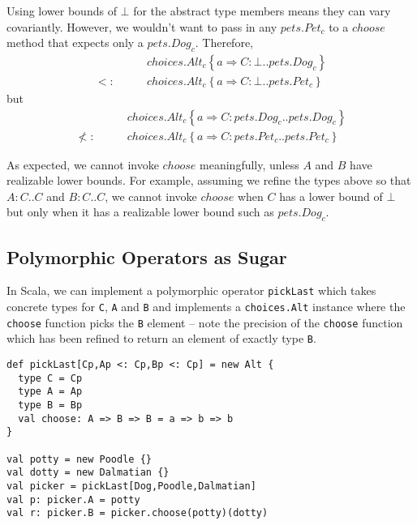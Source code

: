 \documentclass[9pt]{sigplanconf}
\def\code{\lstinline}  % shorter version so you can write \code|String[Foo]|
\newcommand{\mi}[1]{\mathit{#1}}
\newcommand{\gap}{\quad\quad}
\newcommand{\sub}{<:}
\newcommand{\refine}[2]{\left\{#1 \Rightarrow #2 \right\}}
\newcommand{\Ldecl}[3]{#1 : #2..#3}%
\newcommand{\Bot}{\bot}%
\begin{document}
Using lower bounds of $\Bot$ for the abstract type members means they
can vary covariantly. However, we wouldn't want to pass in any
${\mi{pets.Pet_c}}$ to a $\mi{choose}$ method that expects only a
${\mi{pets.Dog_c}}$. Therefore,
\begin{align*}
&{\mi{choices.Alt_c} \refine a {\Ldecl C \Bot {\mi{pets.Dog_c}}}}\\
\sub\gap&{\mi{choices.Alt_c} \refine a {\Ldecl C \Bot {\mi{pets.Pet_c}}}}
\end{align*}
but
\begin{align*}
&{\mi{choices.Alt_c} \refine a {\Ldecl C {\mi{pets.Dog_c}} {\mi{pets.Dog_c}}}}\\
\not\sub\gap&{\mi{choices.Alt_c} \refine a {\Ldecl C {\mi{pets.Pet_c}} {\mi{pets.Pet_c}}}}
\end{align*}

As expected, we cannot invoke $\mi{choose}$ meaningfully, unless $A$
and $B$ have realizable lower bounds. For example, assuming we refine
the types above so that $\Ldecl A C C$ and $\Ldecl B C C$, we cannot
invoke $\mi{choose}$ when $C$ has a lower bound of $\Bot$ but only
when it has a realizable lower bound such as $\mi{pets.Dog_c}$.

\subsection{Polymorphic Operators as Sugar}
In Scala, we can implement a polymorphic operator \code{pickLast}
which takes concrete types for \code{C}, \code{A} and \code{B} and
implements a \code{choices.Alt} instance where the \code{choose}
function picks the \code{B} element -- note the precision of the
\code{choose} function which has been refined to return an element of
exactly type \code{B}.
\begin{lstlisting}
def pickLast[Cp,Ap <: Cp,Bp <: Cp] = new Alt {
  type C = Cp
  type A = Ap
  type B = Bp
  val choose: A => B => B = a => b => b
}

val potty = new Poodle {}
val dotty = new Dalmatian {}
val picker = pickLast[Dog,Poodle,Dalmatian]
val p: picker.A = potty
val r: picker.B = picker.choose(potty)(dotty)
\end{lstlisting}
\end{document}
